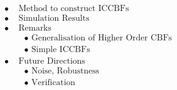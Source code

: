 \documentclass[preview]{standalone}
\begin{document}
\begin{align*}
\bullet & \text{ Method to construct ICCBFs}\\ \bullet &\text{ Simulation Results}\\ \bullet &\text{ Remarks}\\ &\quad \bullet \text{ Generalisation of Higher Order CBFs}\\ &\quad \bullet \text{ Simple ICCBFs}\\ \bullet & \text{ Future Directions}\\ &\quad \bullet \text{ Noise, Robustness}\\ &\quad \bullet \text{ Verification}\\
\end{align*}
\end{document}
